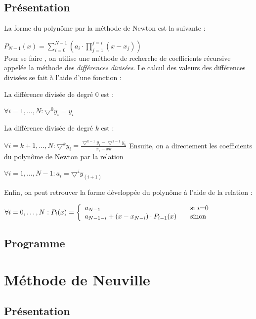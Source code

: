 \documentclass{report}
\begin{document}
      \subsection{Présentation}
	    \noindent	La forme du polynôme par la méthode de Newton est la suivante : 
    	
    	$P_{N-1}(x)= \sum_{i=0}^{N-1} \left( a_{i} \cdot \prod_{j=1}^{j=i} (x-x_{j}) \right)$ \\
    		Pour se faire , on utilise une méthode de recherche de coefficients récursive appelée la méthode des \textit{différences divisées}. Le calcul des valeurs des différences divisées se fait à l'aide d'une fonction : 
    	
    	La différence divisée de degré $0$ est :
    	
    	
    	 $\forall i=1,\ldots, N :  \boldsymbol{\bigtriangledown}^{0}y_{i} = y_{i} $
    	 
    	 La différence divisée de degré $k$ est : 
    	 
    	 $\forall i=k+1,\ldots,N : \boldsymbol{\bigtriangledown}^{k}y_{i} = \frac{\bigtriangledown^{k-1}y_{i}-\bigtriangledown^{k-1}y_{k}}{x_{i}-x{k}}$
    	 \newline
    	 Ensuite, on a directement les coefficients du polynôme de Newton par la relation 
    	 
    	 $\forall i=1,\ldots,N-1 : a_{i} = \boldsymbol{\bigtriangledown}^{i}y_{(i+1)}$
    	 \newline
    	 
    	\noindent Enfin, on peut retrouver la forme développée du polynôme à l'aide de la relation :
    	 
    	 $\forall i=0,\ldots,N : P_{i}(x) = \left\{
  \begin{array}{l l}
    a_{N-1} & \quad \text{si $i$=0}\\
    a_{N-1-i} + (x-x_{N-i}) \cdot P_{i-1}(x) & \quad \text{sinon}
  \end{array} \right. $
      \subsection{Programme}
	
    \newpage
    \section{Méthode de Neuville}
      \subsection{Présentation}
	
\end{document}
